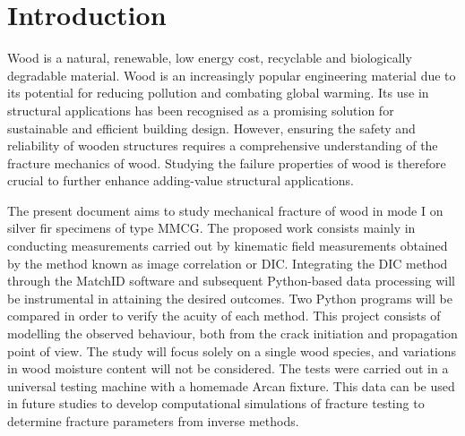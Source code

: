 \documentclass[3p,times,procedia]{elsarticle}
\begin{document}

\section{Introduction}\label{S:intro}

Wood is a natural, renewable, low energy cost, recyclable and biologically degradable material. Wood is an increasingly popular engineering material due to its potential for reducing pollution and combating global warming. Its use in structural applications has been recognised as a promising solution for sustainable and efficient building design. However, ensuring the safety and reliability of wooden structures requires a comprehensive understanding of the fracture mechanics of wood. Studying the failure properties of wood is therefore crucial to further enhance adding-value structural applications.

The present document aims to study mechanical fracture of wood in mode I on silver fir specimens of type MMCG. The proposed work consists mainly in conducting measurements carried out by kinematic field measurements obtained by the method known as image correlation or DIC. Integrating the DIC method through the MatchID software and subsequent Python-based data processing will be instrumental in attaining the desired outcomes. Two Python programs will be compared in order to verify the acuity of each method. This project consists of modelling the observed behaviour, both from the crack initiation and propagation point of view. The study will focus solely on a single wood species, and variations in wood moisture content will not be considered. The tests were carried out in a universal testing machine with a homemade Arcan fixture. This data can be used in future studies to develop computational simulations of fracture testing to determine fracture parameters from inverse methods.
\end{document}
